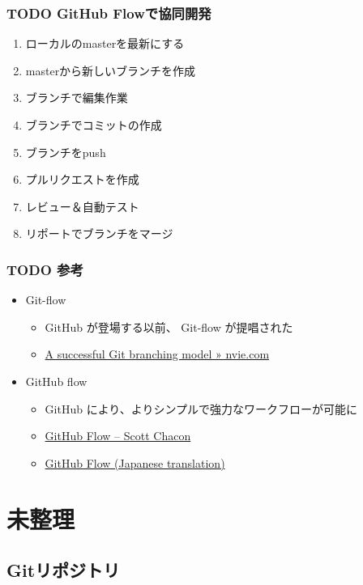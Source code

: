 \documentclass[a4paper,twoside,twocolumn]{bxjsarticle}
\begin{document}
\subsubsection{{\bfseries\sffamily TODO} GitHub Flowで協同開発}
\label{sec-2-3-1}
\begin{enumerate}
\item ローカルのmasterを最新にする
\item masterから新しいブランチを作成
\item ブランチで編集作業
\item ブランチでコミットの作成
\item ブランチをpush
\item プルリクエストを作成
\item レビュー＆自動テスト
\item リポートでブランチをマージ
\end{enumerate}

\subsubsection{{\bfseries\sffamily TODO} 参考}
\label{sec-2-3-2}
\begin{itemize}
\item Git-flow
\begin{itemize}
\item GitHub が登場する以前、 Git-flow が提唱された
\item \href{http://nvie.com/posts/a-successful-git-branching-model/}{A successful Git branching model » nvie.com}
\end{itemize}
\item GitHub flow
\begin{itemize}
\item GitHub により、よりシンプルで強力なワークフローが可能に
\item \href{http://scottchacon.com/2011/08/31/github-flow.html}{GitHub Flow – Scott Chacon}
\item \href{https://gist.github.com/Gab-km/3705015}{GitHub Flow (Japanese translation)}
\end{itemize}
\end{itemize}

\section{未整理}
\label{sec-3}
\subsection{Gitリポジトリ}
\label{sec-3-1}
\end{document}
